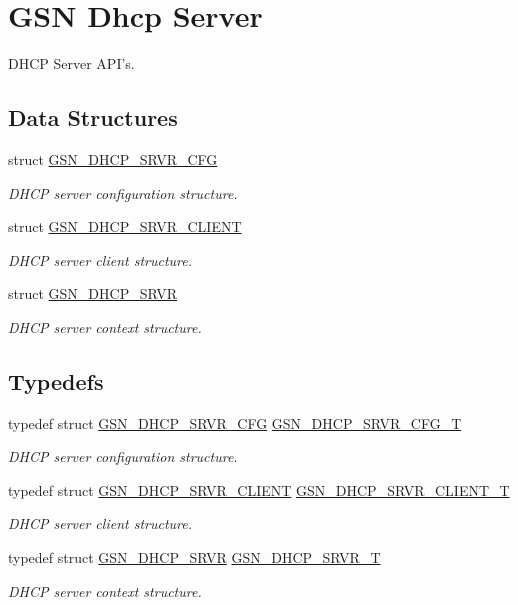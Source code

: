 \hypertarget{a00661}{
\section{GSN Dhcp Server}
\label{a00661}
}


DHCP Server API's.  


\subsection*{Data Structures}
\begin{DoxyCompactItemize}
\item 
struct \hyperlink{a00044}{GSN\_\-DHCP\_\-SRVR\_\-CFG}
\begin{DoxyCompactList}\small\item\em DHCP server configuration structure. \end{DoxyCompactList}\item 
struct \hyperlink{a00045}{GSN\_\-DHCP\_\-SRVR\_\-CLIENT}
\begin{DoxyCompactList}\small\item\em DHCP server client structure. \end{DoxyCompactList}\item 
struct \hyperlink{a00043}{GSN\_\-DHCP\_\-SRVR}
\begin{DoxyCompactList}\small\item\em DHCP server context structure. \end{DoxyCompactList}\end{DoxyCompactItemize}
\subsection*{Typedefs}
\begin{DoxyCompactItemize}
\item 
typedef struct \hyperlink{a00044}{GSN\_\-DHCP\_\-SRVR\_\-CFG} \hyperlink{a00661_ga5a69af0df29b0dc56441470a22cf3ab3}{GSN\_\-DHCP\_\-SRVR\_\-CFG\_\-T}
\begin{DoxyCompactList}\small\item\em DHCP server configuration structure. \end{DoxyCompactList}\item 
typedef struct \hyperlink{a00045}{GSN\_\-DHCP\_\-SRVR\_\-CLIENT} \hyperlink{a00661_ga54a36c901a1b4f316e5202de8b35def8}{GSN\_\-DHCP\_\-SRVR\_\-CLIENT\_\-T}
\begin{DoxyCompactList}\small\item\em DHCP server client structure. \end{DoxyCompactList}\item 
typedef struct \hyperlink{a00043}{GSN\_\-DHCP\_\-SRVR} \hyperlink{a00661_ga894396f4b78d0bb4bd07286f4004fe8f}{GSN\_\-DHCP\_\-SRVR\_\-T}
\begin{DoxyCompactList}\small\item\em DHCP server context structure. \end{DoxyCompactList}\end{DoxyCompactItemize}
